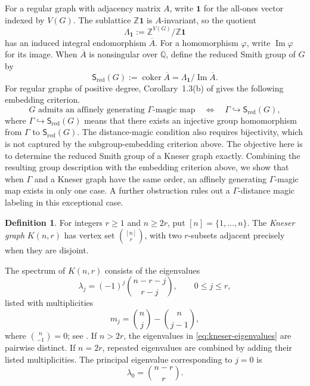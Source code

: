 \documentclass[11pt,reqno]{amsart}
\theoremstyle{plain}
\theoremstyle{definition}
\newtheorem{definition}[theorem]{Definition}
\theoremstyle{remark}
\newcommand{\Sred}{\mathsf S_{\mathrm{red}}}
\newcommand{\Lamone}{\Lambda_{\mathbf1}}
\begin{document}
For a regular graph with adjacency matrix $A$, write $\mathbf1$ for the
all-ones vector indexed by $V(G)$. The sublattice $\mathbb Z\mathbf1$ is
$A$-invariant, so the quotient
\[
  \Lamone:=\mathbb Z^{V(G)}/\mathbb Z\mathbf1
\]
has an induced integral endomorphism $\overline A$. For a
homomorphism $\varphi$, write $\operatorname{Im}\varphi$ for its image. When
$\overline A$ is nonsingular over $\mathbb Q$, define the reduced Smith group
of $G$ by
\[
  \Sred(G):=\operatorname{coker}\overline A
  =\Lamone/\operatorname{Im}\overline A.
\]
For regular graphs of positive degree, Corollary~1.3(b) of \cite{Bat26} gives
the following embedding criterion.
\[
  G\text{ admits an affinely generating }\Gamma\text{-magic map}
  \quad\Longleftrightarrow\quad
  \Gamma\hookrightarrow\Sred(G),
\]
where $\Gamma\hookrightarrow\Sred(G)$ means that there exists an injective
group homomorphism from $\Gamma$ to $\Sred(G)$.
The distance-magic condition also requires bijectivity, which is not captured
by the subgroup-embedding criterion above. The objective here is to determine
the reduced Smith group of a Kneser graph exactly.
Combining the resulting group description with the embedding criterion above,
we show that when $\Gamma$ and a Kneser graph have the same order, an affinely
generating $\Gamma$-magic map exists in only one case. A further obstruction
rules out a $\Gamma$-distance magic labeling in this exceptional case.

\begin{definition}\label{def:kneser}
For integers $r\ge1$ and $n\ge2r$, put $[n]=\{1,\dots,n\}$. The
\emph{Kneser graph} $K(n,r)$ has vertex set $\binom{[n]}r$, with two
$r$-subsets adjacent precisely when they are disjoint.
\end{definition}

The spectrum of $K(n,r)$ consists of the eigenvalues
\begin{equation}\label{eq:kneser-eigenvalues}
  \lambda_j=(-1)^j\binom{n-r-j}{r-j},
  \qquad 0\le j\le r,
\end{equation}
listed with multiplicities
\begin{equation}\label{eq:kneser-multiplicities}
  m_j=\binom nj-\binom n{j-1},
\end{equation}
where $\binom n{-1}=0$; see \cite[Chapter~9]{GR01}. If $n>2r$, the eigenvalues
in \eqref{eq:kneser-eigenvalues} are pairwise distinct. If $n=2r$, repeated
eigenvalues are combined by adding their listed multiplicities. The principal
eigenvalue corresponding to $j=0$ is
\[
  \lambda_0=\binom{n-r}{r}.
\]
\end{document}
